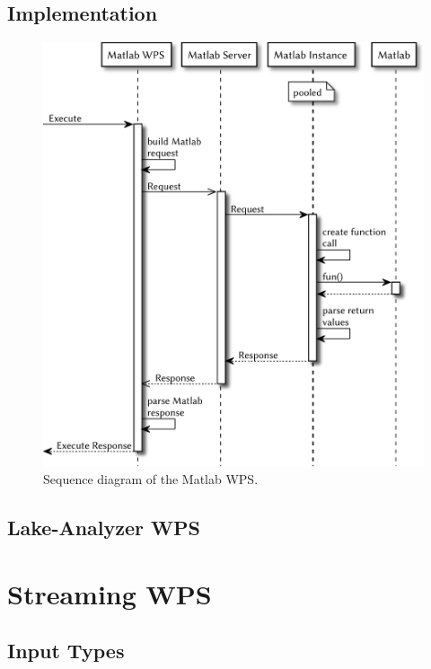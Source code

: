 		\subsection{Implementation}
		\begin{figure}[!htb]
			\centering
			\includegraphics[width=.8125\textwidth]{figures/sequence-diagramm-mwps.pdf}
			\caption{\label{fig:sd:mwps} Sequence diagram of the Matlab WPS.} %
		\end{figure}
		\subsection{Lake-Analyzer WPS}
	\section{Streaming WPS}
		\subsection{Input Types}
